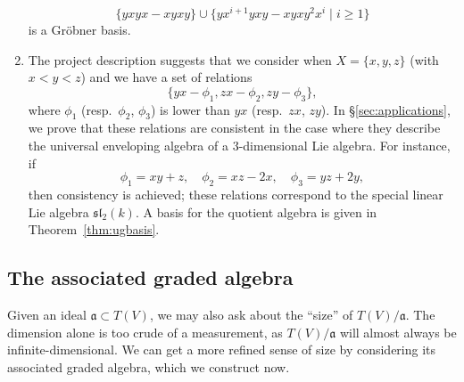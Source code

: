 \begin{enumerate}
	\[
		\{yxyx - xyxy\} \cup \{yx^{i+1}yxy - xyxy^2 x^i \mid i \geq 1\}
	\]
	is a Gr\"obner basis.
    \item The project description suggests that we consider when $X = \{x,y,z\}$ (with $x<y<z$) and we have a set of relations
\begin{equation*}
\{yx-\phi_1,zx-\phi_2,zy-\phi_3\},
\end{equation*}
where $\phi_1$ (resp.\ $\phi_2$, $\phi_3$) is lower than $yx$ (resp.\ $zx$, $zy$). In \S\ref{sec:applications}, we prove that these relations are consistent in the case where they describe the universal enveloping algebra of a $3$-dimensional Lie algebra. For instance, if
\begin{equation*}
\phi_1=xy+z,\quad\phi_2=xz-2x,\quad\phi_3=yz+2y,
\end{equation*}
then consistency is achieved; these relations correspond to the special linear Lie algebra $\mathfrak{sl}_2(k)$. A basis for the quotient algebra is given in Theorem~\ref{thm:ugbasis}.
\end{enumerate}

\subsection{The associated graded algebra}\label{sec:assoc-graded}
Given an ideal $\mathfrak{a} \subset T(V)$, we may also ask about the ``size'' of $T(V)/\mathfrak{a}$. The dimension alone is too crude of a measurement, as $T(V)/\mathfrak{a}$ will almost always be infinite-dimensional. We can get a more refined sense of size by considering its associated graded algebra, which we construct now.

